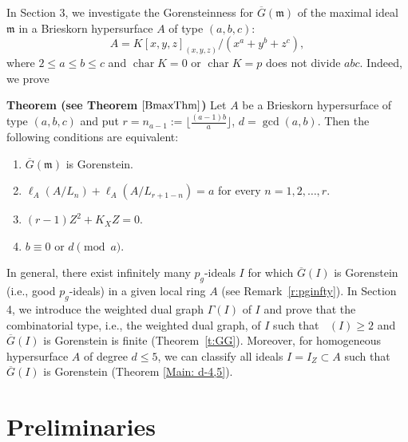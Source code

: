 \documentclass[12pt]{amsart}
\theoremstyle{definition}
\theoremstyle{remark}
\numberwithin{equation}{section}
\newcommand{\thmref}[1]{Theorem~\ref{#1}}
\newcommand{\remref}[1]{Remark~\ref{#1}}
\DeclareMathOperator{\chara}{char}
\DeclareMathOperator{\br}{\bar r}
\newcommand{\m}{\mathfrak m}
\renewcommand{\:}{\colon}
\begin{document}
\par \vspace{3mm}
In Section 3, we investigate the Gorensteinness for $\overline{G}(\m)$  
of the maximal ideal $\m$ in a Brieskorn hypersurface $A$ of type $(a,b,c)$:
\[
A=K[x,y,z]_{(x,y,z)}/(x^a+y^b+z^c), 
\]
where $2 \le a \le b \le c$ and $\chara K=0$ or $\chara K=p$ does not divide $abc$.
Indeed, we prove 
\par \vspace{3mm} \par \noindent 
{\bf Theorem (see Theorem $\ref{BmaxThm}$)} 
Let $A$ be a Brieskorn hypersurface of type $(a,b,c)$ and put $r=n_{a-1}:=\lfloor \frac{(a-1)b}{a} \rfloor$, $d=\gcd(a,b)$. 
Then the following conditions are equivalent$:$
\begin{enumerate}
\item $\overline{G}(\m)$ is Gorenstein. 
\item $\ell_A(A/L_n)+\ell_A(A/L_{r+1-n})=a$ for every $n=1,2,\ldots, r$.  
\item $(r-1)Z^2+K_XZ=0$.  
\item $b \equiv 0$ or $d \pmod{a}$.
\end{enumerate}

\par \vspace{3mm}
In general, there exist infinitely many $p_g$-ideals $I$ for which $\overline{G}(I)$ is Gorenstein 
(i.e., good $p_g$-ideals)  in a given local ring $A$  (see \remref{r:pginfty}). 
In Section 4,  we introduce the weighted dual graph $\Gamma(I)$ of $I$ and prove that the combinatorial type, i.e., the weighted dual graph, of $I$ 
such that $\br(I)\ge 2$ and $\overline{G}(I)$ is Gorenstein is finite (\thmref{t:GG}). 
Moreover, for homogeneous hypersurface $A$ of degree $d \le 5$, we can classify all ideals 
$I=I_Z \subset A$ such that $\overline{G}(I)$ is Gorenstein (Theorem \ref{Main: d-4,5}).  



\section{Preliminaries}
 
\end{document}
